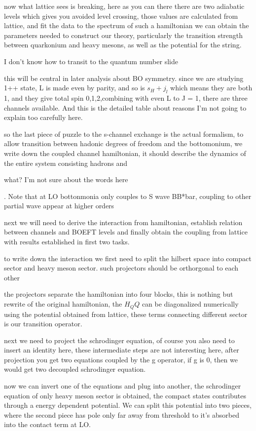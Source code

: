 \documentclass[11pt,a4paper]{article}
\newcommand{\draftcue}[1]{\begin{private}#1\end{private}}
\begin{document}
now what lattice sees is breaking, here as you can there there are two adiabatic levels which gives you avoided level crossing, those values are calculated from lattice, and fit the data to the spectrum of such a hamiltonian we can obtain the parameters needed to construct our theory, particularly the transition strength between quarkonium and heavy mesons, as well as the potential for the string.

\draftcue{ I don't know how to transit to the quantum number slide}

this will be central in later analysis about BO symmetry. since we are studying 1++ state, L is made even by parity, and so is $s_H + j_l$ which means they are both 1, and they give total spin 0,1,2,combining with even L to J = 1, there  are three channels available. And this is the detailed table about reasons I'm not going to explain too carefully here.

so the last piece of puzzle to the s-channel exchange is the actual formalism, to allow transition between hadonic degrees of freedom and the bottomonium, we write down the coupled channel hamiltonian, it should describe the dynamics of the entire system consisting hadrons and \draftcue{what? I'm not sure about the words here}. Note that at LO bottonmonia only couples to S wave BB*bar, coupling to other partial wave appear at higher orders

next we will need to derive the interaction from hamiltonian, establish relation between \BOchiEFT channels and BOEFT levels and finally obtain the coupling from lattice with results established in first two tasks.

to write down the interaction we first need to split the hilbert space into compact sector and heavy meson sector. such projectors should be orthorgonal to each other

the projectors separate the hamiltonian into four blocks, this is nothing but rewrite of the original hamiltonian, the $H_QQ$ can be diagonalized numerically using the potential obtained from lattice, these terms connecting different sector is our transition operator.

next we need to project the schrodinger equation,  of course you also need to insert an identity here, these intermediate steps are not interesting here, after projection you get two equations coupled by the g operator, if g is 0, then we would get two decoupled schrodinger equation.

now we can invert one of the equations and plug into another, the schrodinger equation of only heavy meson sector is obtained, the compact states contributes through a energy dependent potential. We can split this potential into two pieces, where the second piece has pole only far away from threshold to it's absorbed into the contact term at LO.
\end{document}

